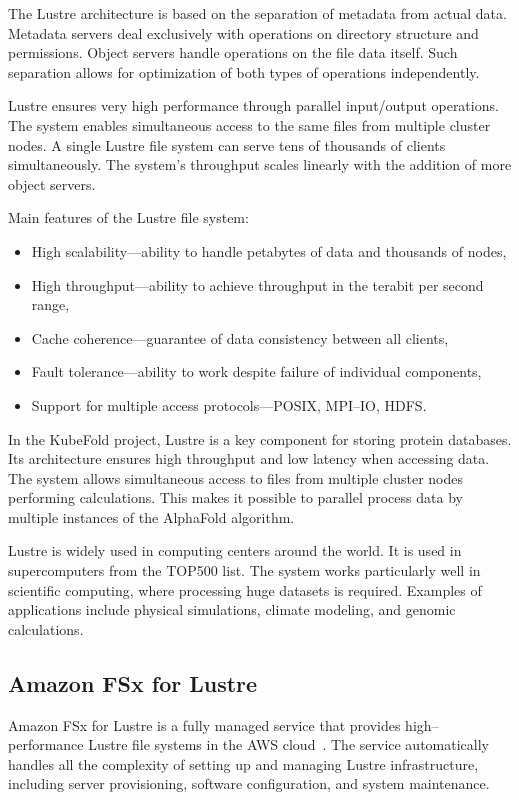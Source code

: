 The Lustre architecture is based on the separation of metadata from actual data.
Metadata servers deal exclusively with operations on directory structure and permissions.
Object servers handle operations on the file data itself.
Such separation allows for optimization of both types of operations independently.

Lustre ensures very high performance through parallel input/output operations.
The system enables simultaneous access to the same files from multiple cluster nodes.
A single Lustre file system can serve tens of thousands of clients simultaneously.
The system's throughput scales linearly with the addition of more object servers.

Main features of the Lustre file system:
\begin{itemize}
    \item High scalability—ability to handle petabytes of data and thousands of nodes,
    \item High throughput—ability to achieve throughput in the terabit per second range,
    \item Cache coherence—guarantee of data consistency between all clients,
    \item Fault tolerance—ability to work despite failure of individual components,
    \item Support for multiple access protocols—POSIX, MPI--IO, HDFS\@.
\end{itemize}

In the KubeFold project, Lustre is a key component for storing protein databases.
Its architecture ensures high throughput and low latency when accessing data.
The system allows simultaneous access to files from multiple cluster nodes performing calculations.
This makes it possible to parallel process data by multiple instances of the AlphaFold algorithm.

Lustre is widely used in computing centers around the world.
It is used in supercomputers from the TOP500 list.
The system works particularly well in scientific computing, where processing huge datasets is required.
Examples of applications include physical simulations, climate modeling, and genomic calculations.

\subsection{Amazon FSx for Lustre}\label{subsec:amazon-fsx-for-lustre}

Amazon FSx for Lustre is a fully managed service that provides high--performance Lustre file systems in the AWS cloud~\cite{aws_fsx}.
The service automatically handles all the complexity of setting up and managing Lustre infrastructure, including server provisioning, software configuration, and system maintenance.

